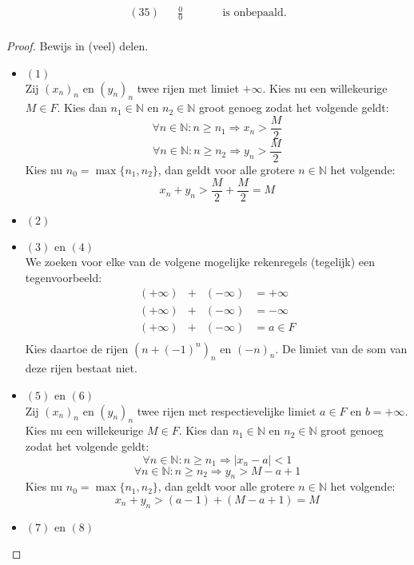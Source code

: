\documentclass[main.tex]{subfiles}
\begin{document}
\begin{st}
\[\begin{array}{crccccl}
  \end{array}
  \]
  \[
  \begin{array}{crccccl}
    (35) &                          & \frac{0}{0}             &&&& \text{ is onbepaald.}\\
  \end{array}
  \]
  \begin{proof}
    Bewijs in (veel) delen.
    \begin{itemize}
    \item $(1)$\\
      Zij $(x_{n})_{n}$ en $(y_{n})_{n}$ twee rijen met limiet $+\infty$.
      Kies nu een willekeurige $M\in F$.
      Kies dan $n_{1}\in \mathbb{N}$ en $n_{2}\in \mathbb{N}$ groot genoeg zodat het volgende geldt:
      \[ \forall n\in \mathbb{N}: n \ge n_{1} \Rightarrow x_{n}>\frac{M}{2} \]
      \[ \forall n\in \mathbb{N}: n \ge n_{2} \Rightarrow y_{n}>\frac{M}{2} \]
      Kies nu $n_{0} = \max\{n_{1},n_{2}\}$, dan geldt voor alle grotere $n\in\mathbb{N}$ het volgende:
      \[ x_{n}+y_{n} > \frac{M}{2}+\frac{M}{2} = M \]
    \item $(2)$ 
    \item $(3)$ en $(4)$\\
      We zoeken voor elke van de volgene mogelijke rekenregels (tegelijk) een tegenvoorbeeld:
      \[ 
      \begin{array}{cccc}
        (+\infty) &+& (-\infty) &= +\infty\\
        (+\infty) &+& (-\infty) &= -\infty\\
        (+\infty) &+& (-\infty) &= a \in F\\
      \end{array}
      \]
      Kies daartoe de rijen $(n+(-1)^{n})_{n}$ en $(-n)_{n}$.
      De limiet van de som van deze rijen bestaat niet.
    \item $(5)$ en $(6)$\\
      Zij $(x_{n})_{n}$ en $(y_{n})_{n}$ twee rijen met respectievelijke limiet $a\in F$ en $b = +\infty$.
      Kies nu een willekeurige $M \in F$.
      Kies dan $n_{1}\in \mathbb{N}$ en $n_{2}\in \mathbb{N}$ groot genoeg zodat het volgende geldt:
      \[ \forall n\in \mathbb{N}: n \ge n_{1} \Rightarrow |x_{n}-a| < 1 \]
      \[ \forall n\in \mathbb{N}: n \ge n_{2} \Rightarrow y_{n} > M-a+1 \]
      Kies nu $n_{0} = \max\{n_{1},n_{2}\}$, dan geldt voor alle grotere $n\in\mathbb{N}$ het volgende:
      \[ x_{n}+y_{n} > (a-1) + (M-a+1) = M \]
    \item $(7)$ en $(8)$ 

\end{itemize}
\end{proof}
\end{st}
\end{document}
